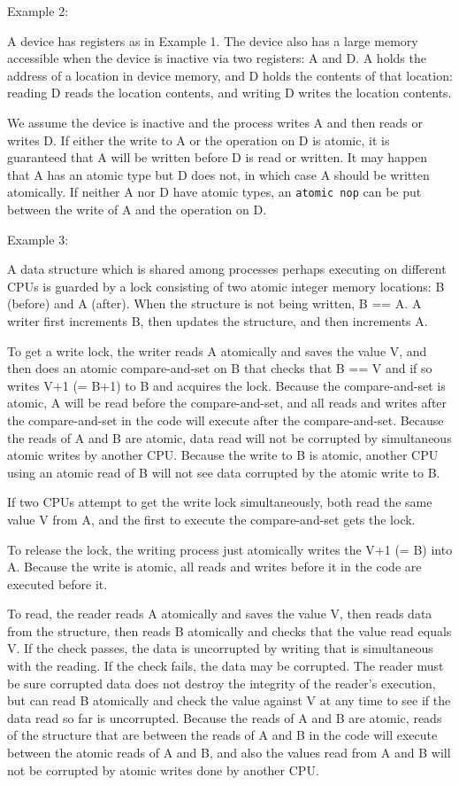 \documentclass[12pt]{article}
\newenvironment{indpar}[1][0.3in]%
	{\begin{list}{}%
		     {\setlength{\itemsep}{0in}%
		      \setlength{\topsep}{0in}%
		      \setlength{\parsep}{1ex}%
		      \setlength{\labelwidth}{#1}%
		      \setlength{\leftmargin}{#1}%
		      \addtolength{\leftmargin}{\labelsep}}%
	 \item}%
	{\end{list}}
\begin{document}
Example 2:
\begin{indpar}
A device has registers as in Example 1.  The device also has a large
memory accessible when the device is inactive via two registers: A and D.
A holds the address of
a location in device memory, and D holds the contents of that location:
reading D reads the location contents, and writing D writes the location
contents.

We assume the device is inactive and the process writes A and then
reads or writes D.  If either the write to A or the operation on D
is atomic, it is guaranteed that A will be written before D is read or
written.  It may happen that A has an atomic type but D does not,
in which case A should be written atomically.  If neither A nor D have
atomic types, an {\tt atomic nop} can be put between the write of A and
the operation on D.
\end{indpar}

Example 3:
\begin{indpar}
A data structure which is shared among processes perhaps executing
on different CPUs is guarded by a lock consisting of two atomic integer
memory locations: B (before) and A (after).  When the structure is
not being written, B == A.  A writer first increments B, then
updates the structure, and then increments A.

To get a write lock, the writer reads A atomically and saves the value V,
and then does
an atomic compare-and-set on B that checks that B == V and if so writes
V+1 (= B+1) to B and acquires the lock.  Because the compare-and-set is atomic,
A will be read before the compare-and-set, and all reads and writes
after the compare-and-set in the code will execute after the compare-and-set.
Because the reads of A and B are atomic, data read 
will not be corrupted by simultaneous atomic writes by another CPU.
Because the write to B is atomic, another CPU using an atomic read of B
will not see data corrupted by the atomic write to B.

If two CPUs attempt to get the write lock simultaneously, both read the same
value V from A, and the first to execute the compare-and-set gets the lock.

To release the lock, the writing process just atomically
writes the V+1 (= B) into A.  Because the write is atomic, all reads and
writes before it in the code are executed before it.

To read, the reader reads A atomically and saves the value V,
then reads data from the structure, then reads B atomically and
checks that the value read equals V.  If the check passes, the data
is uncorrupted by writing that is simultaneous with the reading.
If the check fails, the data may be corrupted.  The reader must be
sure corrupted data does not destroy the integrity of the reader's execution,
but can read B atomically and check the value against V
at any time to see if the data read so far is uncorrupted.
Because the reads of A and B are atomic, reads of the structure that
are between the reads of A and B in the code will execute between
the atomic reads of A and B, and also the values read from A and B will not be
corrupted by atomic writes done by another CPU.

\end{indpar}
\end{document}
